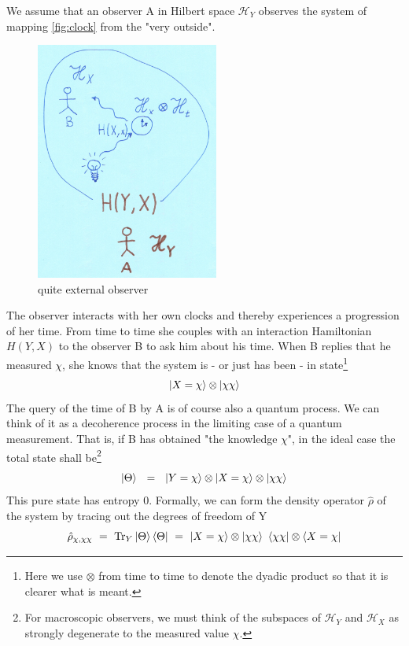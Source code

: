 \documentclass[12pt]{article}
\begin{document}
We assume that an observer A in Hilbert space $\mathscr{H}_Y$ observes the system of mapping \ref{fig:clock} from the "very outside". 
\begin{figure}[!h]\begin{center}
  \includegraphics[width=6cm]{Entropie.png}
  \caption{quite external observer}
  \label{fig:entropy}
\end{center}\end{figure}
The observer interacts with her own clocks and thereby experiences a progression of her time. From time to time she couples with an interaction Hamiltonian $H(Y,X)$ to the observer B to ask him about his time. When B replies that he measured $\chi$, she knows that the system is - or just has been - in state\footnote{Here we use $\otimes$ from time to time to denote the dyadic product so that it is clearer what is meant.}
\begin{equation}
\ket{X=\chi}\otimes\ket{\chi\chi}
\end{equation}
The query of the time of B by A is of course also a quantum process. We can think of it as a decoherence process in the limiting case of a quantum measurement. That is, if B has obtained "the knowledge $\chi$", in the ideal case the total state shall be\footnote{For macroscopic observers, we must think of the subspaces of $\mathscr{H}_Y$ and $\mathscr{H}_X$ as strongly degenerate to the measured value $\chi$.}
\begin{equation}
\ket{\Theta}\ \ =\ \ \ket{Y=\chi}\otimes\ket{X=\chi}\otimes\ket{\chi\chi}
\end{equation}
This pure state has entropy 0. Formally, we can form the density operator $\hat{\rho}$ of the system by tracing out the degrees of freedom of Y
\begin{equation}
\hat{\rho}_{\chi,\chi\chi}\ =\ \operatorname{Tr}_Y \ket{\Theta}\bra{\Theta}\ =\ 
\ket{X=\chi}\otimes\ket{\chi\chi}\ \bra{\chi\chi}\otimes\bra{X=\chi} 
\end{equation}
\end{document}
